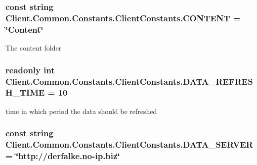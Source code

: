 \subsubsection[{C\+O\+N\+T\+E\+N\+T}]{\setlength{\rightskip}{0pt plus 5cm}const string Client.\+Common.\+Constants.\+Client\+Constants.\+C\+O\+N\+T\+E\+N\+T = \char`\"{}Content\char`\"{}}\label{classClient_1_1Common_1_1Constants_1_1ClientConstants_a6a503802cb4583e413cafa1fa759de04}


The content folder 

\hypertarget{classClient_1_1Common_1_1Constants_1_1ClientConstants_a1f32abf69f3d2c65bba380688e1c9909}{}
\subsubsection[{D\+A\+T\+A\+\_\+\+R\+E\+F\+R\+E\+S\+H\+\_\+\+T\+I\+M\+E}]{\setlength{\rightskip}{0pt plus 5cm}readonly int Client.\+Common.\+Constants.\+Client\+Constants.\+D\+A\+T\+A\+\_\+\+R\+E\+F\+R\+E\+S\+H\+\_\+\+T\+I\+M\+E = 10\hspace{0.3cm}{\ttfamily [static]}}\label{classClient_1_1Common_1_1Constants_1_1ClientConstants_a1f32abf69f3d2c65bba380688e1c9909}


time in which period the data should be refreshed 

\hypertarget{classClient_1_1Common_1_1Constants_1_1ClientConstants_a906b8b02ae4c5068a0e8200f61874cec}{}
\subsubsection[{D\+A\+T\+A\+\_\+\+S\+E\+R\+V\+E\+R}]{\setlength{\rightskip}{0pt plus 5cm}const string Client.\+Common.\+Constants.\+Client\+Constants.\+D\+A\+T\+A\+\_\+\+S\+E\+R\+V\+E\+R = \char`\"{}http\+://derfalke.\+no-\/ip.\+biz\char`\"{}}\label{classClient_1_1Common_1_1Constants_1_1ClientConstants_a906b8b02ae4c5068a0e8200f61874cec}


